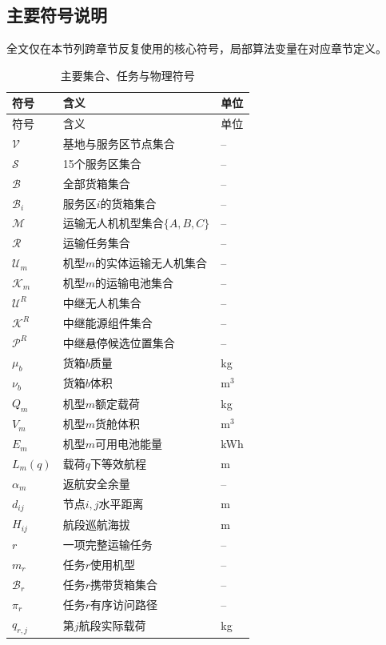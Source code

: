 \documentclass[UTF8,a4paper,12pt]{ctexart}
\begin{document}
\subsection{主要符号说明}

全文仅在本节列跨章节反复使用的核心符号，局部算法变量在对应章节定义。

\begin{longtable}{p{3cm}p{8.5cm}p{2cm}}
\caption{主要集合、任务与物理符号}\\
\toprule
符号 & 含义 & 单位\\
\midrule
\endfirsthead
\toprule
符号 & 含义 & 单位\\
\midrule
\endhead
$\mathcal V$ & 基地与服务区节点集合 & --\\
$\mathcal S$ & 15个服务区集合 & --\\
$\mathcal B$ & 全部货箱集合 & --\\
$\mathcal B_i$ & 服务区$i$的货箱集合 & --\\
$\mathcal M$ & 运输无人机机型集合$\{A,B,C\}$ & --\\
$\mathcal R$ & 运输任务集合 & --\\
$\mathcal U_m$ & 机型$m$的实体运输无人机集合 & --\\
$\mathcal K_m$ & 机型$m$的运输电池集合 & --\\
$\mathcal U^R$ & 中继无人机集合 & --\\
$\mathcal K^R$ & 中继能源组件集合 & --\\
$\mathcal P^R$ & 中继悬停候选位置集合 & --\\
$\mu_b$ & 货箱$b$质量 & kg\\
$\nu_b$ & 货箱$b$体积 & m$^3$\\
$Q_m$ & 机型$m$额定载荷 & kg\\
$V_m$ & 机型$m$货舱体积 & m$^3$\\
$E_m$ & 机型$m$可用电池能量 & kWh\\
$L_m(q)$ & 载荷$q$下等效航程 & m\\
$\alpha_m$ & 返航安全余量 & --\\
$d_{ij}$ & 节点$i,j$水平距离 & m\\
$H_{ij}$ & 航段巡航海拔 & m\\
$r$ & 一项完整运输任务 & --\\
$m_r$ & 任务$r$使用机型 & --\\
$\mathcal B_r$ & 任务$r$携带货箱集合 & --\\
$\pi_r$ & 任务$r$有序访问路径 & --\\
$q_{r,j}$ & 第$j$航段实际载荷 & kg\\

\end{longtable}
\end{document}
